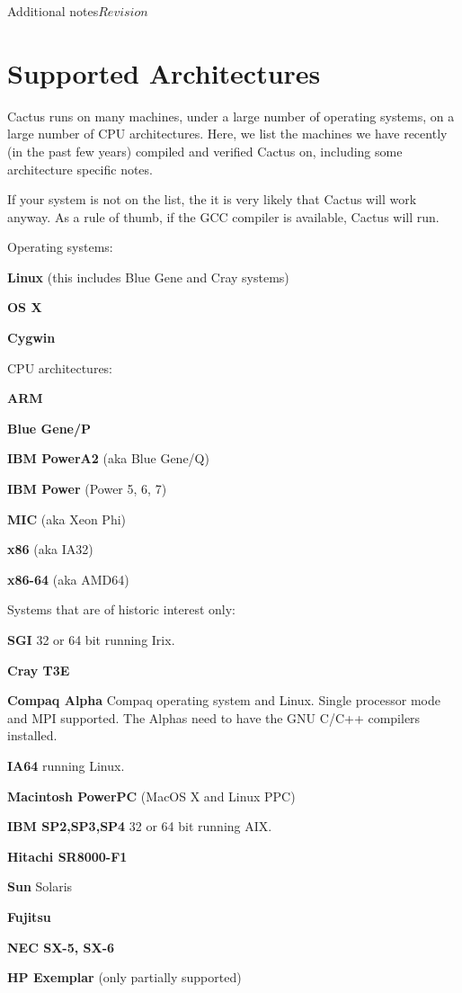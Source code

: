 \begin{cactuspart}{Additional notes}{}{$Revision$}

\section{Supported Architectures}
\label{sec:suar}

Cactus runs on many machines, under a large number of operating
systems, on a large number of CPU architectures. Here, we list the
machines we have recently (in the past few years) compiled and
verified Cactus on, including some architecture specific notes.

If your system is not on the list, the it is very likely that Cactus
will work anyway. As a rule of thumb, if the GCC compiler is
available, Cactus will run.

Operating systems:
\begin{Lentry}
\item[\textbf{Linux}] (this includes Blue Gene and Cray systems)
\item[\textbf{OS X}]
\item[\textbf{Cygwin}]
\end{Lentry}

CPU architectures:
\begin{Lentry}
\item[\textbf{ARM}]
\item[\textbf{Blue Gene/P}]
\item[\textbf{IBM PowerA2}] (aka Blue Gene/Q)
\item[\textbf{IBM Power}] (Power 5, 6, 7)
\item[\textbf{MIC}] (aka Xeon Phi)
\item[\textbf{x86}] (aka IA32)
\item[\textbf{x86-64}] (aka AMD64)
\end{Lentry}

Systems that are of historic interest only:
\begin{Lentry}
\item[\textbf{SGI}] 32 or 64 bit running Irix.
\item[\textbf{Cray T3E}]
\item[\textbf{Compaq Alpha}]  Compaq operating system and Linux.
  Single processor
  mode and MPI supported. The Alphas need to have the GNU C/C++
  compilers installed.
\item[\textbf{IA64}]  running Linux.
\item[\textbf{Macintosh PowerPC}] (MacOS X and Linux PPC)
\item[\textbf{IBM SP2,SP3,SP4}] 32 or 64 bit running AIX.
\item[\textbf{Hitachi SR8000-F1}]
\item[\textbf{Sun} Solaris]
\item[\textbf{Fujitsu}]
\item[\textbf{NEC SX-5, SX-6}]
\item[\textbf{HP Exemplar}] (only partially supported)
\end{Lentry}


\end{cactuspart}
